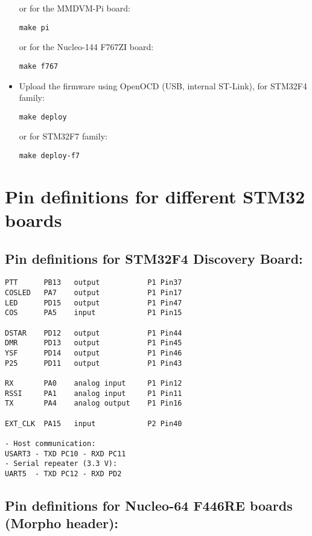 \documentclass[]{article}
\begin{document}
\begin{itemize}[leftmargin=*]
or for the MMDVM-Pi board:
\begin{lstlisting}[style=DOS]
make pi
\end{lstlisting}

or for the Nucleo-144 F767ZI board:
\begin{lstlisting}[style=DOS]
make f767
\end{lstlisting}

\item Upload the firmware using OpenOCD (USB, internal ST-Link), for STM32F4 family:
\begin{lstlisting}[style=DOS]
make deploy
\end{lstlisting}

or for STM32F7 family:
\begin{lstlisting}[style=DOS]
make deploy-f7
\end{lstlisting}

\end{itemize}

\section{Pin definitions for different STM32 boards}

\subsection{Pin definitions for STM32F4 Discovery Board:}

\begin{verbatim}
PTT      PB13   output           P1 Pin37
COSLED   PA7    output           P1 Pin17
LED      PD15   output           P1 Pin47
COS      PA5    input            P1 Pin15

DSTAR    PD12   output           P1 Pin44
DMR      PD13   output           P1 Pin45
YSF      PD14   output           P1 Pin46
P25      PD11   output           P1 Pin43

RX       PA0    analog input     P1 Pin12
RSSI     PA1    analog input     P1 Pin11
TX       PA4    analog output    P1 Pin16

EXT_CLK  PA15   input            P2 Pin40

- Host communication:
USART3 - TXD PC10 - RXD PC11
- Serial repeater (3.3 V):
UART5  - TXD PC12 - RXD PD2
\end{verbatim}

\subsection{Pin definitions for Nucleo-64 F446RE boards (Morpho header):}
\end{document}

